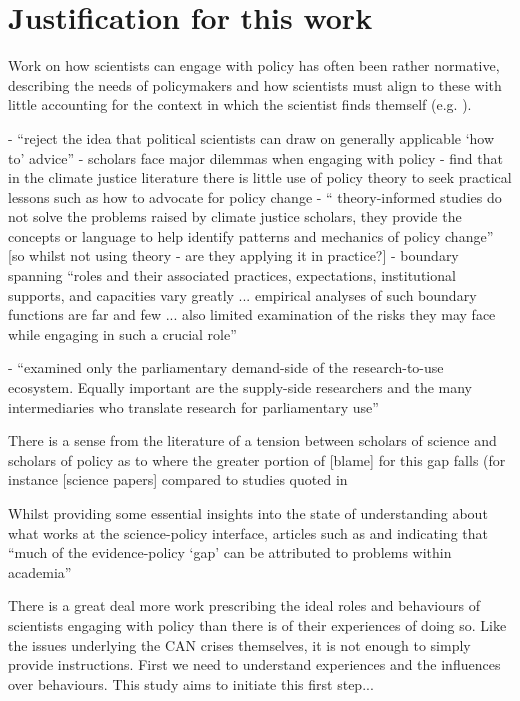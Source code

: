 \section{Justification for this work}
Work on how scientists can engage with policy has often been rather normative, describing the needs of policymakers and how scientists must align to these with little accounting for the context in which the scientist finds themself (e.g. \cite{McNie2007,GeddesDP2018,BlessenohlS2022,Bisbal2024}). 

\cite{CairneyO2020} - ``reject the idea that political scientists can draw on generally applicable `how to' advice''
\cite{CairneyO2020} - scholars face major dilemmas when engaging with policy
\cite{CairneyTS2023} - find that in the climate justice literature there is little use of policy theory to seek practical lessons such as how to advocate for policy change  - `` theory-informed studies do not solve the problems raised by climate justice scholars, they provide the concepts or language to help identify patterns and mechanics of policy change'' [so whilst not using theory - are they applying it in practice?]
\cite{JagannathanEtAl2023} - boundary spanning ``roles and their associated practices, expectations, institutional supports, and capacities vary greatly ... empirical analyses of such boundary functions are far and few ... also limited examination of the risks they may face while engaging in such a crucial role''

\cite{KennyRHTB2017} - ``examined only the parliamentary demand-side of the research-to-use ecosystem. Equally important are the supply-side researchers and the many intermediaries who translate research for parliamentary use''



There is a sense from the literature of a tension between scholars of science and scholars of policy as to where the greater portion of [blame] for this gap falls (for instance [science papers] compared to studies quoted in 

Whilst providing some essential insights into the state of understanding about what works at the science-policy interface, articles such as \textcite{OliverHBGC2022} and \textcite{Oliver202X} indicating that ``much of the evidence-policy ‘gap’ can be attributed to problems within academia''


There is a great deal more work prescribing the ideal roles and behaviours of scientists engaging with policy than there is of their experiences of doing so. Like the issues underlying the CAN crises themselves, it is not enough to simply provide instructions. First we need to understand experiences and the influences over behaviours. This study aims to initiate this first step...


